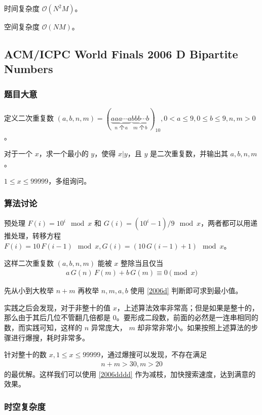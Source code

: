 				时间复杂度 $\mathcal{O}\left(N^2M\right)$。
					
				空间复杂度 $\mathcal{O}\left(NM\right)$。
			
		\newpage
		\subsection{ACM/ICPC World Finals 2006 D Bipartite Numbers}
			\subsubsection{题目大意}
				定义二次重复数 $(a,b,n,m) = (\underbrace{aaa\cdots a}_{n \text{ 个} \, a}
				\underbrace{bbb\cdots b}_{m \text{ 个} \, b})_{10}, 0 < a \le 9, 0 \le b \le 9, n,m > 0$。
				
				对于一个 $x$，求一个最小的 $y$，使得 $x | y$，且 $y$ 是二次重复数，并输出其 $a, b, n, m$。
				
				$1 \le x \le \num{99999}$，多组询问。
			\subsubsection{算法讨论}
				预处理 $F(i) = 10^i \mod{x}$ 和 $G(i) = (10^i - 1) / 9 \mod{x}$，两者都可以用递推处理，转移方程 $F(i) = 10 \,F(i - 1) \mod{x}, G(i) = (10\,G(i-1) + 1) \mod{x}$。
				
				这样二次重复数 $(a,b,n,m)$ 能被 $x$ 整除当且仅当 
				\begin{align}
					a\,G(n)\,F(m) +  b\,G(m) \equiv 0 \pmod{x} \label{2006d}
				\end{align}
				
				先从小到大枚举 $n+m$ 再枚举 $n, m, a, b$ 使用 \eqref{2006d} 判断即可求到最小值。
				
				实践之后会发现，对于非整十的值 $x$，上述算法效率非常高；但是如果是整十的，那么由于其后几位不管翻几倍都是 0。要形成二段数，前面的必然是一连串相同的数，而实践可知，这样的 $n$ 异常庞大， $m$ 却非常非常小。如果按照上述算法的步骤进行爆搜，耗时非常多。
				
				 针对整十的数 $x, 1 \le x \le \num{99999}$，通过爆搜可以发现，不存在满足
					\begin{align}
						n + m > 30, m > 20\label{2006dddd}
					\end{align}
				的最优解。这样我们可以使用 \eqref{2006dddd} 作为减枝，加快搜索速度，达到满意的效果。
				
				 
			\subsubsection{时空复杂度}
				
